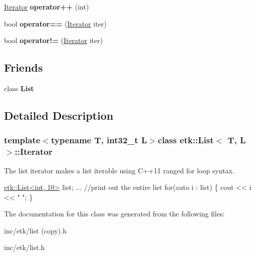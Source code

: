 \begin{DoxyCompactItemize}
\item 
\hypertarget{classetk_1_1_list_1_1_iterator_ae1f9efc5598a14487881bd7281fd27dd}{\hyperlink{classetk_1_1_list_1_1_iterator}{Iterator} {\bfseries operator++} (int)}\label{classetk_1_1_list_1_1_iterator_ae1f9efc5598a14487881bd7281fd27dd}

\item 
\hypertarget{classetk_1_1_list_1_1_iterator_a971c5acbef70bdd9a9513a87ad40fd4e}{bool {\bfseries operator==} (\hyperlink{classetk_1_1_list_1_1_iterator}{Iterator} iter)}\label{classetk_1_1_list_1_1_iterator_a971c5acbef70bdd9a9513a87ad40fd4e}

\item 
\hypertarget{classetk_1_1_list_1_1_iterator_a7c9b29d64794609438e68b928125f14b}{bool {\bfseries operator!=} (\hyperlink{classetk_1_1_list_1_1_iterator}{Iterator} iter)}\label{classetk_1_1_list_1_1_iterator_a7c9b29d64794609438e68b928125f14b}

\end{DoxyCompactItemize}
\subsection*{Friends}
\begin{DoxyCompactItemize}
\item 
\hypertarget{classetk_1_1_list_1_1_iterator_a17b4022430bcb8cf112cada5d768cdd4}{class {\bfseries List}}\label{classetk_1_1_list_1_1_iterator_a17b4022430bcb8cf112cada5d768cdd4}

\end{DoxyCompactItemize}


\subsection{Detailed Description}
\subsubsection*{template$<$typename T, int32\-\_\-t L$>$class etk\-::\-List$<$ T, L $>$\-::\-Iterator}

The list iterator makes a list iterable using C++11 ranged for loop syntax. 


\begin{DoxyCode}
\hyperlink{classetk_1_1_list}{etk::List<int, 10>} list;
...
\textcolor{comment}{//print out the entire list}
for(\textcolor{keyword}{auto} i : list)
\{
    cout << i << \textcolor{stringliteral}{" "};
\}
\end{DoxyCode}
 

The documentation for this class was generated from the following files\-:\begin{DoxyCompactItemize}
\item 
inc/etk/list (copy).\-h\item 
inc/etk/list.\-h\end{DoxyCompactItemize}
